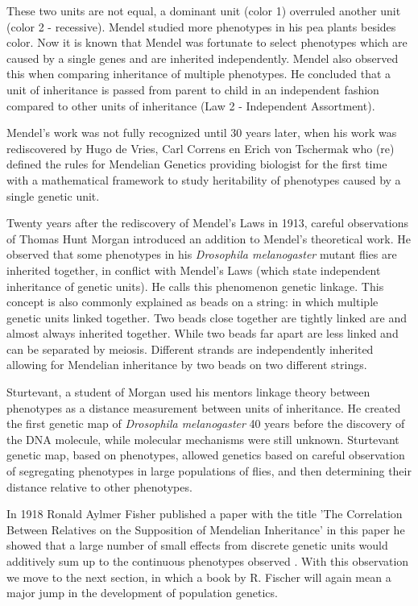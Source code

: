 These two units are not equal, a dominant unit (color 1) overruled another 
unit (color 2 - recessive). Mendel studied more phenotypes in his pea plants 
besides color. Now it is known that Mendel was fortunate to select 
phenotypes which are caused by a single genes and are inherited independently. 
Mendel also observed this when comparing inheritance of multiple phenotypes. 
He concluded that a unit of inheritance is passed from parent to child in an 
independent fashion compared to other units of inheritance 
(Law 2 - Independent Assortment).

Mendel's work was not fully recognized until 30 years later, when his work was 
rediscovered by Hugo de Vries, Carl Correns en Erich von Tschermak who (re) defined the 
rules for Mendelian Genetics \cite{deVries:1889} providing biologist for the first 
time with a mathematical framework to study heritability of phenotypes caused by a 
single genetic unit.

Twenty years after the rediscovery of Mendel's Laws in 1913, careful observations of 
Thomas Hunt Morgan introduced an addition to Mendel's theoretical work. He observed 
that some phenotypes in his \emph{Drosophila melanogaster} mutant flies are inherited 
together, in conflict with Mendel's Laws (which state independent inheritance of 
genetic units). He calls this phenomenon genetic linkage. This concept is also commonly 
explained as beads on a string: in which multiple genetic units linked together. Two beads 
close together are tightly linked are and almost always inherited together. While 
two beads far apart are less linked and can be separated by meiosis. Different 
strands are independently inherited allowing for Mendelian inheritance by two beads 
on two different strings.

Sturtevant, a student of Morgan used his mentors linkage theory between phenotypes 
as a distance measurement between units of inheritance. He created the first genetic 
map of \emph{Drosophila melanogaster} 40 years before the discovery of the DNA molecule, 
while molecular mechanisms were still unknown. Sturtevant genetic map, based on 
phenotypes, allowed genetics based on careful observation of segregating phenotypes in 
large populations of flies, and then determining their distance relative to other 
phenotypes.

In 1918 Ronald Aylmer Fisher published a paper with the title 'The Correlation Between 
Relatives on the Supposition of Mendelian Inheritance' in this paper he showed that a 
large number of small effects from discrete genetic units would additively sum up to 
the continuous phenotypes observed \cite{Fisher:1918}. With this observation we move 
to the next section, in which a book by R. Fischer will again mean a major jump in 
the development of population genetics.

